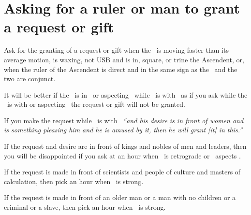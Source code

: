 \section{Asking for a ruler or man to grant a request or gift}
Ask for the granting of a request or gift when the \Moon\, is moving faster than its average motion, is waxing, not USB and is in, square, or trine the Ascendent, or, when the ruler of the Ascendent is direct and in the same sign as the \Moon\, and the two are conjunct.

It will be better if the \Moon\, is in \Cancer\, or aspecting \Cancer\, while \Mercury\, is with \Jupiter\, as if you ask while the \Moon\, is with or aspecting \Saturn\, the request or gift will not be granted.

If you make the request while \Mercury\, is with \Venus\, \textsl{``and his desire is in front of women and is something pleasing him and he is amused by it, then he will grant [it] in this.''}

If the request and desire are in front of kings and nobles of men and leaders, then you will be disappointed if you ask at an hour when \Jupiter\, is retrograde or \Saturn\, aspects \Jupiter.

If the request is made in front of scientists and people of culture and masters of calculation, then pick an hour when \Mercury\, is strong.

If the request is made in front of an older man or a man with no children or a criminal or a slave, then pick an hour when \Saturn\, is strong.
